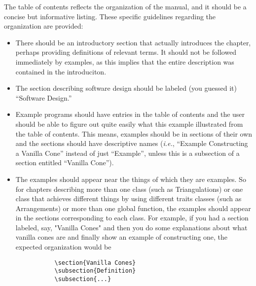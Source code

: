 The table of contents reflects the organization of the manual, and it 
should be a concise but informative listing. These specific guidelines 
regarding the organization are provided:
\begin{itemize}
   \item There should be an introductory section that actually introduces
         the chapter, perhaps providing definitions of relevant terms.  
         It should not be followed immediately by examples, as this implies 
         that the entire description was contained in the introduciton.

   \item The section describing software design should be labeled (you guessed 
         it) ``Software Design.'' 

   \item Example programs should have entries in the table of contents and
         the user should be able to figure out quite easily what this example
         illustrated from the table of contents.  This means, examples should
         be in sections of their own and the sections should have descriptive 
         names (\textit{i.e.}, ``Example Constructing a Vanilla Cone'' instead 
         of just ``Example'', unless this is a subsection of a section
         entitled ``Vanilla Cone'').

   \item The examples should appear near the things of which they are 
         examples.  So for chapters describing more than one class (such as 
         Triangulations) or one class that achieves different things by using 
         different traits classes (such as Arrangements) or more than one
         global function, the examples should appear in the sections 
         corresponding to each class.  For example, if you had a 
         section labeled, say, "Vanilla Cones" and then you do some 
         explanations about what vanilla cones are and finally show an example 
         of constructing one, the expected organization would be 
         \begin{verbatim}
           \section{Vanilla Cones}
           \subsection{Definition}
           \subsection{...}

\end{verbatim}
\end{itemize}
